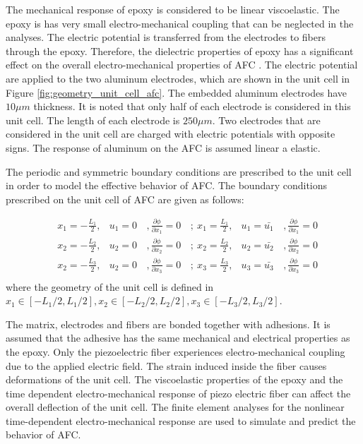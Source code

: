 The mechanical response of epoxy is considered to be linear viscoelastic.
The epoxy is has very small electro-mechanical coupling that can be neglected in the analyses.
The electric potential is transferred from the electrodes to fibers through the epoxy.
Therefore, the dielectric properties of epoxy has a significant effect on the overall electro-mechanical properties of AFC \cite{atitallah2014parametric}. 
The electric potential are applied to the two aluminum electrodes, which are shown in the unit cell in Figure \ref{fig:geometry_unit_cell_afc}.
The embedded aluminum electrodes have $10 \mu m$ thickness.
It is noted that only half of each electrode is considered in this unit cell.
The length of each electrode is $250 \mu m$.
Two electrodes that are considered in the unit cell are charged with electric potentials with opposite signs.
The response of aluminum on the AFC is assumed linear a elastic.

The periodic and symmetric boundary conditions are prescribed to the unit cell in order to model the effective behavior of AFC. 
The boundary conditions prescribed on the unit cell of AFC are given as follows:

\begin{equation}
\begin{aligned} 
& x_1=-\frac{L_1}{2}  ,& u_1=0 &\, , \frac{\partial \phi}{\partial x_1}=0        &\, ; \ x_1= \frac{L_1}{2}  ,& u_1=\bar{u_1} &\, ,  \frac{\partial \phi}{\partial x_1}=0   \\ 
& x_2=-\frac{L_2}{2}  ,& u_2=0 &\, , \frac{\partial \phi}{\partial x_2}=0        &\, ; \ x_2= \frac{L_2}{2}  ,& u_2=\bar{u_2} &\, ,  \frac{\partial \phi}{\partial x_2}=0   \\ 
& x_2=-\frac{L_3}{2}  ,& u_2=0 &\, , \frac{\partial \phi}{\partial x_3}=0        &\, ; \ x_3= \frac{L_3}{2}  ,& u_3=\bar{u_3} &\, , \frac{\partial \phi}{\partial x_3}=0    \\
\end{aligned}
\end{equation}
where the geometry of the unit cell is defined in $x_1 \in [-L_1/2,L_1/2], x_2 \in [-L_2/2,L_2/2], x_3 \in [-L_3/2,L_3/2]$.


The matrix, electrodes and fibers are bonded together with adhesions.
It is assumed that the adhesive has the same mechanical and electrical properties as the epoxy.
Only the piezoelectric fiber experiences electro-mechanical coupling due to the applied electric field.
The strain induced inside the fiber causes deformations of the unit cell.
The viscoelastic properties of the epoxy and the time
 dependent electro-mechanical response of piezo electric fiber can affect the overall deflection of the unit cell.
The finite element analyses for the nonlinear time-dependent electro-mechanical response are used to simulate and predict the behavior of AFC. 

